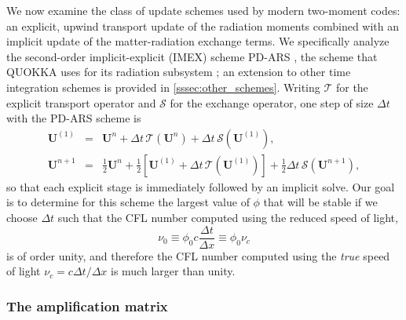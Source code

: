 \documentclass[preprint,12pt,authoryear]{elsarticle}
\newcommand{\vecU}{\mathbf{U}}
\begin{document}
We now examine the class of update schemes used by modern two-moment codes: an explicit, upwind transport update of the radiation moments combined with an implicit update of the matter-radiation exchange terms. We specifically analyze the second-order implicit-explicit (IMEX) scheme PD-ARS \citep{Chu19a}, the scheme that QUOKKA uses for its radiation subsystem \citep{He24a, He24b}; an extension to other time integration schemes is provided in \autoref{sssec:other_schemes}. Writing $\mathcal{T}$ for the explicit transport operator and $\mathcal{S}$ for the exchange operator, one step of size $\Delta t$ with the PD-ARS scheme is
\begin{eqnarray}
    \vecU^{(1)} & = & \vecU^n + \Delta t\, \mathcal{T}(\vecU^n) + \Delta t\, \mathcal{S}(\vecU^{(1)}), \nonumber \\
    \vecU^{n+1} & = & \tfrac{1}{2}\vecU^n + \tfrac{1}{2}\left[\vecU^{(1)} + \Delta t\,\mathcal{T}(\vecU^{(1)})\right] + \tfrac{1}{2}\Delta t\,\mathcal{S}(\vecU^{n+1}),
    \label{eq:pdars}
\end{eqnarray}
so that each explicit stage is immediately followed by an implicit solve. Our goal is to determine for this scheme the largest value of $\phi$ that will be stable if we choose $\Delta t$ such that the CFL number computed using the reduced speed of light,
\begin{equation}
    \nu_0 \equiv \phi_0 c\frac{\Delta t}{\Delta x} \equiv \phi_0 \nu_c
\end{equation}
is of order unity, and therefore the CFL number computed using the \textit{true} speed of light $\nu_c = c\Delta t/\Delta x$ is much larger than unity.



\subsubsection{The amplification matrix}
\label{sssec:ampl}
\end{document}
